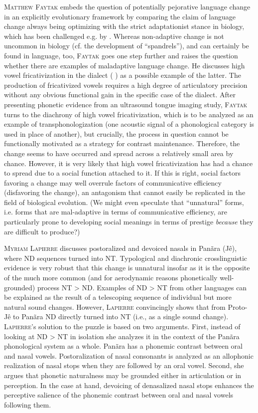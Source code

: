 \documentclass[output=paper,colorlinks,citecolor=brown]{langscibook}
\begin{document}
\textsc{Matthew Faytak} embeds the question of potentially pejorative language change in an explicitly evolutionary framework by comparing the claim of language change always being optimizing with the strict adaptationist stance in biology, which has been challenged e.g. by \citet{gould-lewontin}. Whereas non-adaptive change is not uncommon in biology (cf. the development of ``spandrels''), and can certainly be found in language, too, \textsc{Faytak} goes one step further and raises the question whether there are examples of maladaptive language change. He discusses high vowel fricativization in the   dialect ( ) as a possible example of the latter. The production of fricativized vowels requires a high degree of articulatory precision without any obvious functional gain in the specific case of the   dialect. After presenting phonetic evidence from an ultrasound tongue imaging study, \textsc{Faytak} turns to the diachrony of high vowel fricativization, which is to be analyzed as an example of transphonologization (one acoustic signal of a phonological category is used in place of another), but crucially, the process in question cannot be functionally motivated as a strategy for contrast maintenance. Therefore, the change seems to have occurred and spread across a relatively small area by chance. However, it is very likely that high vowel fricativization has had a chance to spread due to a social function attached to it. If this is right, social factors favoring a change may well overrule factors of communicative efficiency (disfavoring the change), an antagonism that cannot easily be replicated in the field of biological evolution. (We might even speculate that ``unnatural'' forms, i.e. forms that are mal-adaptive in terms of communicative efficiency, are particularly prone to developing social meanings in terms of prestige \textit{because} they are difficult to produce?)

\textsc{Myriam Lapierre} discusses postoralized and devoiced nasals in Pan\~ara (J\^e), where ND sequences turned into NT. Typological and diachronic crosslinguistic evidence is very robust that this change is unnatural insofar as it is the opposite of the much more common (and for aerodynamic reasons phonetically well-grounded) process NT > ND. Examples of ND > NT from other languages can be explained as the result of a telescoping sequence of individual but more natural sound changes. However, \textsc{Lapierre} convincingly shows that from Proto- J\^e to Pan\~ara ND directly turned into NT (i.e., as a single sound change). \textsc{Lapierre}'s solution to the puzzle is based on two arguments. First, instead of looking at ND > NT in isolation she analyzes it in the context of the Pan\~ara phonological system as a whole. Pan\~ara has a phonemic contrast between oral and nasal vowels. Postoralization of nasal consonants is analyzed as an allophonic realization of nasal stops when they are followed by an oral vowel. Second, she argues that phonetic naturalness may be grounded either in articulation or in perception. In the case at hand, devoicing of denasalized nasal stops enhances the perceptive salience of the phonemic contrast between oral and nasal vowels following them.
\end{document}

